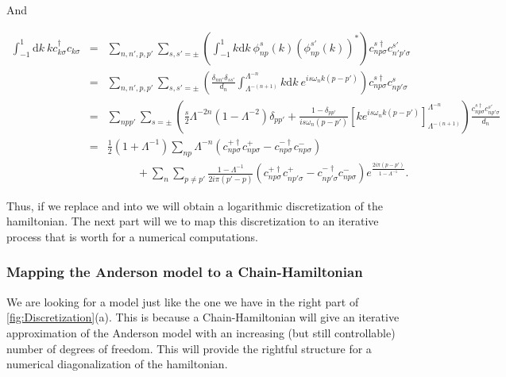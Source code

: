 And 

\begin{eqnarray}
\int_{-1}^{1}\mbox{d}k\ kc_{k\sigma}^{\dagger}c_{k\sigma} & = & \sum_{n,n',p,p'}\sum_{s,s'=\pm}\left(\int_{-1}^{1}k\mbox{d}k\ \phi_{np}^{s}(k)\left(\phi_{np}^{s'}(k)\right)^{*}\right)c_{np\sigma}^{s\dagger}c_{n'p'\sigma}^{s'}\nonumber \\
 & = & \sum_{n,n',p,p'}\sum_{s,s'=\pm}\left(\frac{\delta_{nn'}\delta_{ss'}}{d_{n}}\int_{\Lambda^{-(n+1)}}^{\Lambda^{-n}}k\mbox{d}k\ e^{is\omega_{n}k\left(p-p'\right)}\right)c_{np\sigma}^{s\dagger}c_{np'\sigma}^{s}\nonumber \\
 & = & \sum_{npp'}\sum_{s=\pm}\left(\frac{s}{2}\Lambda^{-2n}\left(1-\Lambda^{-2}\right)\delta_{pp'}+\frac{1-\delta_{pp'}}{is\omega_{n}\left(p-p'\right)}\left[ke^{is\omega_{n}k\left(p-p'\right)}\right]_{\Lambda^{-(n+1)}}^{\Lambda^{-n}}\right)\frac{c_{np\sigma}^{s\dagger}c_{np'\sigma}^{s'}}{d_{n}}\nonumber \\
 & = & \frac{1}{2}\left(1+\Lambda^{-1}\right)\sum_{np}\Lambda^{-n}\left(c_{np\sigma}^{+\dagger}c_{np\sigma}^{+}-c_{np\sigma}^{-\dagger}c_{np\sigma}^{-}\right)\nonumber \\
 &  & \ \ \ \ \ \ \!\ \ \ \ \!\ \ +\sum_{n}\sum_{p\neq p'}\frac{1-\Lambda^{-1}}{2i\pi\left(p'-p\right)}\left(c_{np\sigma}^{+\dagger}c_{np'\sigma}^{+}-c_{np'\sigma}^{-\dagger}c_{np\sigma}^{-}\right)e^{\frac{2i\pi\left(p-p'\right)}{1-\Lambda^{-1}}}.\label{eq:second-integral}
\end{eqnarray}


Thus, if we replace  and 
into  we will obtain a logarithmic discretization
of the hamiltonian. The next part will we to map this discretization
to an iterative process that is worth for a numerical computations. 

\subsubsection{Mapping the Anderson model to a Chain-Hamiltonian}

We are looking for a model just like the one we have in the right part of  \ref{fig:Discretization}(a).
This is because a Chain-Hamiltonian will give an iterative approximation
of the Anderson model with an increasing (but still controllable)
number of degrees of freedom. This will provide the rightful structure
for a numerical diagonalization of the hamiltonian. \\


